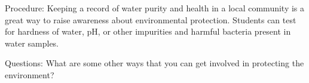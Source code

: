 \begin{multicols}{2}
\begin{description*}
\item[Procedure:]{Keeping a record of water purity and health in a local community is a great way to raise awareness about environmental protection. Students can test for hardness of water, pH, or other impurities and harmful bacteria present in water samples.}
\item[Questions:]{What are some other ways that you can get involved in protecting the environment?}
\end{description*}



\end{multicols}

\pagebreak